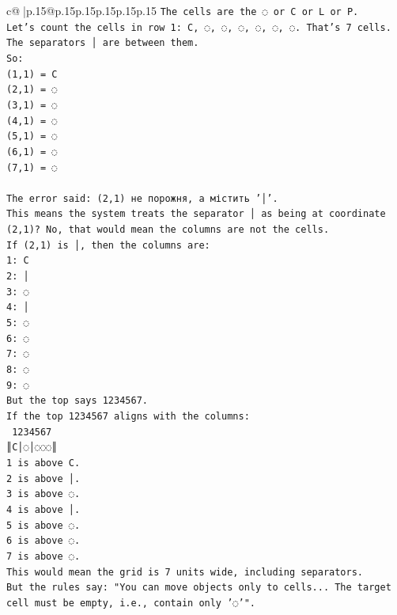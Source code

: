 \documentclass{article}
\begin{document}
{\begin{supertabular}{c@{$\;$}|p{.15\linewidth}@{}p{.15\linewidth}p{.15\linewidth}p{.15\linewidth}p{.15\linewidth}p{.15\linewidth}}
{{{\texttt{The cells are the ◌ or C or L or P.} \\
\texttt{Let's count the cells in row 1: C, ◌, ◌, ◌, ◌, ◌, ◌. That's 7 cells.} \\
\texttt{The separators │ are between them.} \\
\texttt{So:} \\
\texttt{(1,1) = C} \\
\texttt{(2,1) = ◌} \\
\texttt{(3,1) = ◌} \\
\texttt{(4,1) = ◌} \\
\texttt{(5,1) = ◌} \\
\texttt{(6,1) = ◌} \\
\texttt{(7,1) = ◌} \\
\\ 
\texttt{The error said: (2,1) не порожня, а містить '│'.} \\
\texttt{This means the system treats the separator │ as being at coordinate (2,1)? No, that would mean the columns are not the cells.} \\
\texttt{If (2,1) is │, then the columns are:} \\
\texttt{1: C} \\
\texttt{2: │} \\
\texttt{3: ◌} \\
\texttt{4: │} \\
\texttt{5: ◌} \\
\texttt{6: ◌} \\
\texttt{7: ◌} \\
\texttt{8: ◌} \\
\texttt{9: ◌} \\
\texttt{But the top says 1234567.} \\
\texttt{If the top 1234567 aligns with the columns:} \\
\texttt{ 1234567} \\
\texttt{║C│◌│◌◌◌║} \\
\texttt{1 is above C.} \\
\texttt{2 is above │.} \\
\texttt{3 is above ◌.} \\
\texttt{4 is above │.} \\
\texttt{5 is above ◌.} \\
\texttt{6 is above ◌.} \\
\texttt{7 is above ◌.} \\
\texttt{This would mean the grid is 7 units wide, including separators.} \\
\texttt{But the rules say: "You can move objects only to cells... The target cell must be empty, i.e., contain only '◌'".} \\
}}}
\end{supertabular}}
\end{document}
